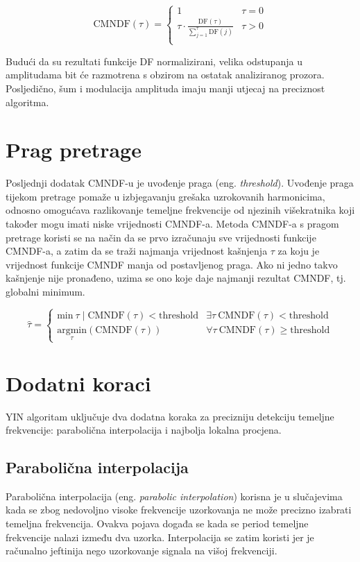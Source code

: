 \documentclass[times, utf8, diplomski, numeric]{fer}
\begin{document}
\begin{equation}
	\mathrm{CMNDF}(\tau) =
	\begin{cases}
		1 & \tau = 0 \\
		\tau \cdot \frac{\mathrm{DF}(\tau)}{\sum_{j = 1}^{\tau}{\mathrm{DF}(j)}} & \tau > 0 \\
	\end{cases}
\end{equation}

Budući da su rezultati funkcije DF normalizirani, velika odstupanja u amplitudama bit će razmotrena s obzirom na ostatak analiziranog prozora. Posljedično, šum i modulacija amplituda imaju manji utjecaj na preciznost algoritma.


\section{Prag pretrage}
%
Posljednji dodatak CMNDF-u je uvođenje praga (eng. \textit{threshold}). Uvođenje praga tijekom pretrage pomaže u izbjegavanju grešaka uzrokovanih harmonicima, odnosno omogućava razlikovanje temeljne frekvencije od njezinih višekratnika koji također mogu imati niske vrijednosti CMNDF-a. Metoda CMNDF-a s pragom pretrage koristi se na način da se prvo izračunaju sve vrijednosti funkcije CMNDF-a, a zatim da se traži najmanja vrijednost kašnjenja $\tau$ za koju je vrijednost funkcije CMNDF manja od postavljenog praga. Ako ni jedno takvo kašnjenje nije pronađeno, uzima se ono koje daje najmanji rezultat CMNDF, tj. globalni minimum.

\begin{equation}
	\hat{\tau} =
	\begin{cases}
		\mathrm{min} \ \tau \mid \mathrm{CMNDF}(\tau) < \mathrm{threshold} & \exists \tau \ \mathrm{CMNDF}(\tau) < \mathrm{threshold} \\
		\underset{\tau}{\mathrm{argmin}} (\mathrm{CMNDF}(\tau)) & \forall \tau \ \mathrm{CMNDF}(\tau) \geq \mathrm{threshold}
	\end{cases}
\end{equation}
 
\section{Dodatni koraci}
%
YIN algoritam uključuje dva dodatna koraka za precizniju detekciju temeljne frekvencije: parabolična interpolacija i najbolja lokalna procjena.

\subsection{Parabolična interpolacija}
%
Parabolična interpolacija (eng. \textit{parabolic interpolation}) korisna je u slučajevima kada se zbog nedovoljno visoke frekvencije uzorkovanja ne može precizno izabrati temeljna frekvencija. Ovakva pojava događa se kada se period temeljne frekvencije nalazi između dva uzorka. Interpolacija se zatim koristi jer je računalno jeftinija nego uzorkovanje signala na višoj frekvenciji. 
\end{document}
